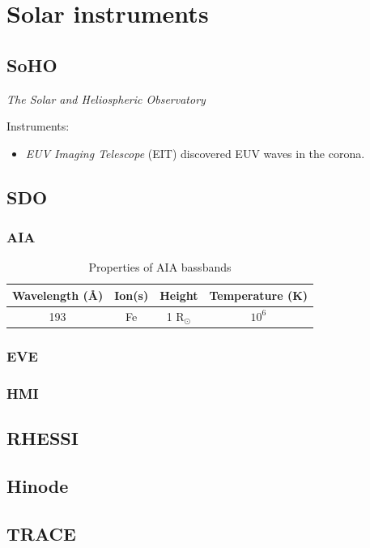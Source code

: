 \documentclass{article}
\begin{document}
\section{Solar instruments}
\subsection{SoHO}
\emph{The Solar and Heliospheric Observatory}

Instruments:
\begin{itemize}
    \item \emph{EUV Imaging Telescope} (EIT) discovered EUV waves
        in the corona.
\end{itemize}

\subsection{SDO}
\subsubsection{AIA}
\begin{table}[h]
    \centering
    \begin{tabular}{c c c c}
        Wavelength (\AA{}) & Ion(s) & Height & Temperature (K)\\
        \hline
        193 & Fe & 1 R$_{\odot}$ & $10^{6}$\\
        \hline\hline
    \end{tabular}
    \caption{Properties of AIA bassbands}
\end{table}
\subsubsection{EVE}
\subsubsection{HMI}
\subsection{RHESSI}
\subsection{Hinode}
\subsection{TRACE}
\end{document}
